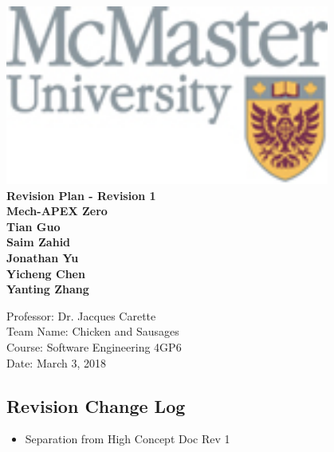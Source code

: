 \documentclass{article}
\begin{document}

\begin{titlepage}
    \begin{center}
        \vspace*{1cm}
        \includegraphics[width=0.8\textwidth]{logo.jpg}
        \\
        \textbf{\Large Revision Plan - Revision 1}
        \vspace{0.5cm}
        \textbf{\Large  \\Mech-APEX Zero}
        \vspace{1cm}
        \textbf{\\Tian Guo\\Saim Zahid\\Jonathan Yu\\ Yicheng Chen \\Yanting Zhang }
        \vfill
        \vspace{0.8cm}
        \begin{flushright}
        Professor: Dr. Jacques Carette\\
        Team Name: Chicken and Sausages\\
        Course: Software Engineering 4GP6\\
        Date: March 3, 2018
        \end{flushright}
    \end{center}
\end{titlepage}


\subsection*{Revision Change Log}
\begin{itemize}
	\item Separation from High Concept Doc Rev 1 

\end{itemize}
\end{document}
